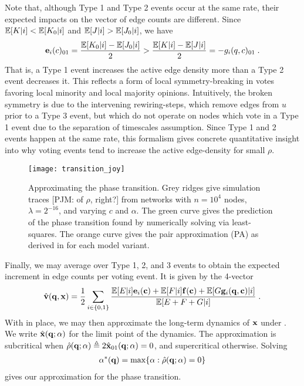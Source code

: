 \documentclass[review, onefignum, onetabnum]{siamart171218}
\newcommand{\pjm}[1]{{\color{blue}[PJM: #1]}}
\begin{document}
        Note that, although Type 1 and Type 2 events occur at the same rate, their expected impacts on the vector of edge counts are different. 
        Since $\mathbb{E}[K|i] < \mathbb{E}[K_0|i]$ and $\mathbb{E}[J|i] > \mathbb{E}[J_0|i]$, we have   
        \begin{align}
            \mathbf{e}_i(c)_{01} = \frac{\mathbb{E}[K_0|i] - \mathbb{E}[J_0|i]}{2} > \frac{\mathbb{E}[K|i] - \mathbb{E}[J|i]}{2} =   
            -{g}_i(q,c)_{01}\;.
        \end{align}
        That is, a Type 1 event increases the active edge density more than a Type 2 event decreases it. 
        This reflects a form of local symmetry-breaking in votes favoring local minority and local majority opinions. 
        Intuitively, the broken symmetry is due to the intervening rewiring-steps, which remove edges from $u$ prior to a Type 3 event, but which do not operate on nodes which vote in a Type 1 event due to the separation of timescales assumption. 
        Since Type 1 and 2 events happen at the same rate, this formalism gives concrete quantitative insight into why voting events tend to increase the active edge-density for small $\rho$. 
        
        
        
        

		\begin{figure}
			\centering
				\texttt{[image: transition\_joy]}
			\caption{Approximating the phase transition. 
			Grey ridges give simulation traces \pjm{of $\rho$, right?} from networks with $n = 10^4$ nodes, $\lambda = 2^{-16}$, and varying $c$ and $\alpha$. 
			The green curve gives the prediction of the phase transition found by numerically solving  via least-squares. 
			The orange curve gives the pair approximation (PA) as derived in \cite{Durrett2012} for each model variant.}
			\label{fig:transition_joy}
		\end{figure}
        
        Finally, we may average over Type 1, 2, and 3 events to obtain the expected increment in edge counts per voting event. 
        It is given by the 4-vector 
		\begin{align}
			\hat{\mathbf{v}}(\q, \x) = \frac{1}{2} \sum_{i \in \{0,1\}} \frac{\E[E|i]\mathbf{e}_i(\C) + \E[F|i]\mathbf{f}(\C) + \E[G\mathbf{g}_i(\mathbf{q},\mathbf{c})|i]}{\E[E + F + G|i]}\;. \label{eq:v_hat}
		\end{align}
		With  in place, we may then approximate the long-term dynamics of $\mathbf{x}$ under . 
		We write $\hat{\mathbf{x}}(\mathbf{q}; \alpha)$ for the limit point of the dynamics. 
		The approximation is subcritical when $\hat{\rho}(\mathbf{q}; \alpha) \triangleq 2\hat{\mathbf{x}}_{01}(\mathbf{q}; \alpha) = 0$, and supercritical otherwise. 
		Solving 
		\begin{align}
			\alpha^*(\q) = \max \{\alpha : \hat{\rho}(\q; \alpha) = 0\} \label{eq:transition_approx}
		\end{align}
		gives our approximation for the phase transition. 
\end{document}
